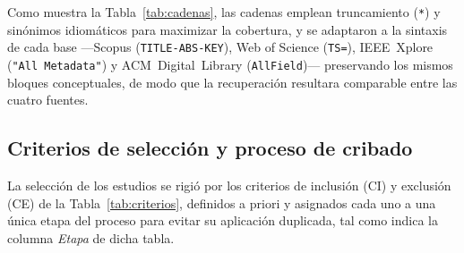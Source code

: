 \documentclass[10pt,journal,twoside,letterpaper]{IEEEtran}
\begin{document}
    Como muestra la Tabla~\ref{tab:cadenas}, las cadenas emplean truncamiento (\texttt{*}) y sinónimos idiomáticos para maximizar la cobertura, y se adaptaron a la sintaxis de cada base ---Scopus (\texttt{TITLE-ABS-KEY}), Web of Science (\texttt{TS=}), IEEE~Xplore (\texttt{"All Metadata"}) y ACM~Digital~Library (\texttt{AllField})--- preservando los mismos bloques conceptuales, de modo que la recuperación resultara comparable entre las cuatro fuentes.
    
    \subsection{Criterios de selección y proceso de cribado}
    \label{subsec:seleccion}
    
    La selección de los estudios se rigió por los criterios de inclusión (CI) y exclusión (CE) de la Tabla~\ref{tab:criterios}, definidos a priori y asignados cada uno a una única etapa del proceso para evitar su aplicación duplicada, tal como indica la columna \emph{Etapa} de dicha tabla.
    
\end{document}
